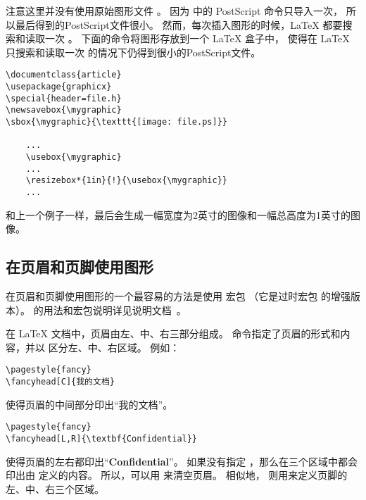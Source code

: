 注意这里并没有使用原始图形文件 。
因为  中的 PostScript 命令只导入一次，
所以最后得到的PostScript文件很小。
然而，每次插入图形的时候，\LaTeX{} 都要搜索和读取一次 。
下面的命令将图形存放到一个 \LaTeX{} 盒子中，
使得在 \LaTeX{} 只搜索和读取一次  的情况下仍得到很小的PostScript文件。
\begin{lstlisting}[xleftmargin=1cm]
\documentclass{article}
\usepackage{graphicx}
\special{header=file.h}
\newsavebox{\mygraphic}
\sbox{\mygraphic}{\texttt{[image: file.ps]}}

	...
	\usebox{\mygraphic}
	...
	\resizebox*{1in}{!}{\usebox{\mygraphic}}
	...

\end{lstlisting}
和上一个例子一样，最后会生成一幅宽度为2英寸的图像和一幅总高度为1英寸的图像。


\subsection{在页眉和页脚使用图形}\label{ssec:headgraph}

在页眉和页脚使用图形的一个最容易的方法是使用  宏包
（它是过时宏包  的增强版本）。
 的用法和宏包说明详见说明文档~\cite{fancyhdr-doc}。

在 \LaTeX{} 文档中，页眉由左、中、右三部分组成。
 命令指定了页眉的形式和内容，并以  区分左、中、右区域。
例如：
\begin{Verbatim}[xleftmargin=1cm]
\pagestyle{fancy}
\fancyhead[C]{我的文档}
\end{Verbatim}
使得页眉的中间部分印出“我的文档”。
\begin{Verbatim}[xleftmargin=1cm]
\pagestyle{fancy}
\fancyhead[L,R]{\textbf{Confidential}}
\end{Verbatim}
使得页眉的左右都印出“\textbf{Confidential}”。
如果没有指定 ，那么在三个区域中都会印出由  定义的内容。
所以，可以用  来清空页眉。 
相似地， 则用来定义页脚的左、中、右三个区域。


